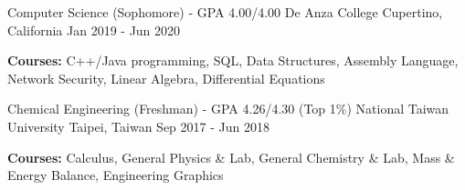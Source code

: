 

\begin{cventries}

  \cventry
    {Computer Science (Sophomore) - GPA 4.00/4.00} %
    {De Anza College} %
    {Cupertino, California} %
    {Jan 2019 - Jun 2020} %
    {
		\vspace{-5.0mm}
		\item {\textbf{Courses:} C++/Java programming, SQL, Data Structures, Assembly Language, Network Security, Linear Algebra, Differential Equations}
	}

  \cventry
    {Chemical Engineering (Freshman) - GPA 4.26/4.30 (Top 1\%)} %
    {National Taiwan University} %
    {Taipei, Taiwan} %
    {Sep 2017 - Jun 2018} %
    {
		\vspace{-5.0mm}
		\item {\textbf{Courses:} Calculus, General Physics \& Lab, General Chemistry \& Lab, Mass \& Energy Balance, Engineering Graphics}
	}

\end{cventries}
